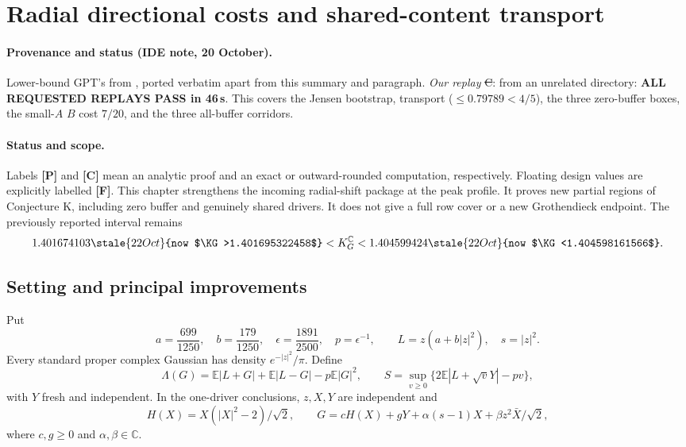\section{Radial directional costs and shared-content transport}
\label{ch:radial-directional-bootstrap}

\paragraph{Provenance and status (IDE note, 20 October).} Lower-bound GPT's  from ,
ported verbatim apart from this summary and paragraph. \emph{Our replay} \st{C}:  from an unrelated directory: \textbf{ALL REQUESTED REPLAYS PASS in 46\,s}. This
covers the Jensen bootstrap, transport ($\le0.79789<4/5$), the three zero-buffer boxes, the small-$A$ $B$ cost $7/20$, and the three all-buffer corridors.

\paragraph{Status and scope.}
Labels \textbf{[P]} and \textbf{[C]} mean an analytic proof and an exact or
outward-rounded computation, respectively. Floating design values are
explicitly labelled \textbf{[F]}. This chapter strengthens the incoming
radial-shift package at the peak profile. It proves new partial regions
of Conjecture K, including zero buffer and genuinely shared drivers.
It does not give a full row cover or a new Grothendieck endpoint.
The previously reported interval remains
\[
 1.401674103\stale{22 Oct}{now $\KG>1.401695322458$}<K_G^{\mathbb C}<1.404599424\stale{22 Oct}{now $\KG<1.404598161566$}.
\]

\subsection{Setting and principal improvements}
Put
\[
 a=\frac{699}{1250},\quad b=\frac{179}{1250},\quad
 \epsilon=\frac{1891}{2500},\quad p=\epsilon^{-1},\qquad
 L=z(a+b|z|^2),\quad s=|z|^2.
\]
Every standard proper complex Gaussian has density
$e^{-|z|^2}/\pi$. Define
\[
 \Lambda(G)=\mathbb E|L+G|+\mathbb E|L-G|-p\mathbb E|G|^2,
 \qquad S=\sup_{v\ge0}\{2\mathbb E|L+\sqrt vY|-pv\},
\]
with $Y$ fresh and independent. In the one-driver conclusions,
$z,X,Y$ are independent and
\[
 H(X)=X(|X|^2-2)/\sqrt2,\qquad
 G=cH(X)+gY+\alpha(s-1)X+\beta z^2\bar X/\sqrt2,
\]
where $c,g\ge0$ and $\alpha,\beta\in\mathbb C$.

